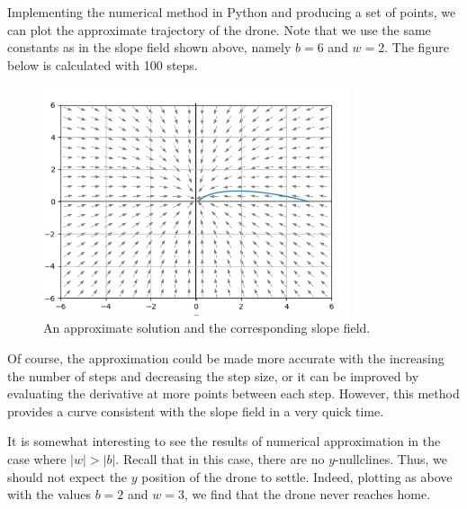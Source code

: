 \documentclass{article}
\begin{document}
    Implementing the numerical method in Python and producing a set of points,
    we can plot the approximate trajectory of the drone. Note that we use the
    same constants as in the slope field shown above, namely $b = 6$ and $w =
    2$. The figure below is calculated with 100 steps.

    \begin{figure}[H]
        \centering
        \includegraphics[width=0.8\textwidth]{media/overlay.png}
        \caption{\label{fig:overlay} An approximate solution and the
        corresponding slope field.}
    \end{figure}

    Of course, the approximation could be made more accurate with the increasing
    the number of steps and decreasing the step size, or it can be improved by
    evaluating the derivative at more points between each step. However, this
    method provides a curve consistent with the slope field in a very quick
    time.

    It is somewhat interesting to see the results of numerical approximation in
    the case where $|w| > |b|$. Recall that in this case, there are no
    $y$-nullclines. Thus, we should not expect the $y$ position of the drone to
    settle. Indeed, plotting as above with the values $b = 2$ and $w = 3$, we
    find that the drone never reaches home.
\end{document}
